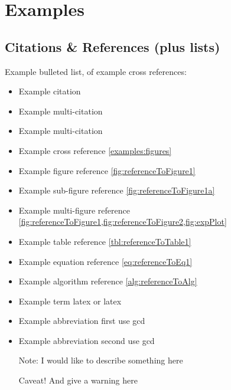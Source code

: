 \chapter{Examples}


\section{Citations \& References (plus lists)}

Example bulleted list, of example cross references:
\begin{itemize}
    \item Example citation \cite{smit54}
    \item Example multi-citation \cite{smit54,colu92}
    \item Example multi-citation \cite{smit54,colu92,gree00}
    \item Example cross reference \cref{examples:figures}
    \item Example figure reference \cref{fig:referenceToFigure1}
    \item Example sub-figure reference \cref{fig:referenceToFigure1a}
    \item Example multi-figure reference \cref{fig:referenceToFigure1,fig:referenceToFigure2,fig:expPlot}
    \item Example table reference \cref{tbl:referenceToTable1}
    \item Example equation reference \cref{eq:referenceToEq1}
    \item Example algorithm reference \cref{alg:referenceToAlg}
    \item Example term \gls{latex} or \Gls{latex}
    \item Example abbreviation first use \gls{gcd}
    \item Example abbreviation second use \gls{gcd}
    \item[Note:] I would like to describe something here
    \item[Caveat!] And give a warning here
\end{itemize} ~


